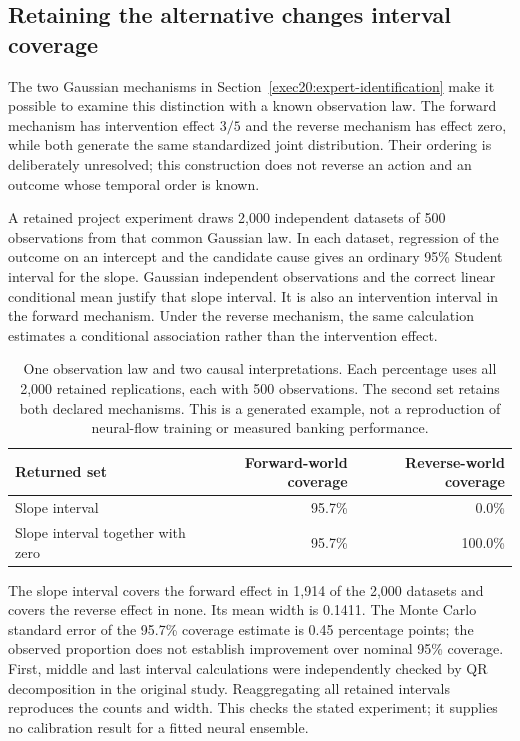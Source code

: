 \subsection{Retaining the alternative changes interval coverage}

The two Gaussian mechanisms in Section~\ref{exec20:expert-identification}
make it possible to examine this distinction with a known observation law.
The forward mechanism has intervention effect $3/5$ and the reverse mechanism
has effect zero, while both generate the same standardized joint distribution.
Their ordering is deliberately unresolved; this construction does not reverse
an action and an outcome whose temporal order is known.

A retained project experiment draws 2,000 independent datasets of 500
observations from that common Gaussian law. In each dataset, regression of
the outcome on an intercept and the candidate cause gives an ordinary 95\%
Student interval for the slope. Gaussian independent observations and the
correct linear conditional mean justify that slope interval. It is also an
intervention interval in the forward mechanism. Under the reverse mechanism,
the same calculation estimates a conditional association rather than the
intervention effect.

\begin{table}[htbp]
\centering\small
\begin{tabular}{lrr}
\toprule
Returned set & Forward-world coverage & Reverse-world coverage\\
\midrule
Slope interval & 95.7\% & 0.0\%\\
Slope interval together with zero & 95.7\% & 100.0\%\\
\bottomrule
\end{tabular}
\caption{One observation law and two causal interpretations. Each percentage
uses all 2,000 retained replications, each with 500 observations. The second
set retains both declared mechanisms. This is a generated example, not a
reproduction of neural-flow training or measured banking performance.}
\label{rel69:graph-coverage}
\end{table}

The slope interval covers the forward effect in 1,914 of the 2,000 datasets
and covers the reverse effect in none. Its mean width is 0.1411. The Monte
Carlo standard error of the 95.7\% coverage estimate is 0.45 percentage points;
the observed proportion does not establish improvement over nominal 95\%
coverage. First, middle and last interval calculations were independently
checked by QR decomposition in the original study. Reaggregating all retained
intervals reproduces the counts and width. This checks the stated experiment;
it supplies no calibration result for a fitted neural ensemble.

